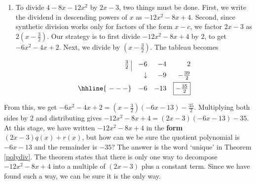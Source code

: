 {\begin{enumerate}
\item To divide $4-8x-12x^2$ by $2x-3$, two things must be done.  First, we write the dividend in descending powers of $x$ as $-12x^2-8x+4$.  Second, since synthetic division works only for factors of the form $x-c$, we factor $2x-3$ as $2\left(x-\frac{3}{2}\right)$.  Our strategy is to first divide $-12x^2-8x+4$ by $2$, to get $-6x^2-4x+2$.  Next, we divide by $\left(x-\frac{3}{2}\right)$.  The tableau becomes

\[ \begin{array}{rrrr}


  \frac{3}{2} \, \, \vline& -6 & -4 & 2   \\ [4pt]

   & \downarrow &  -9  & -\frac{39}{2}  \\ [4pt] \hhline{~---} 
  &  -6  &   -13  & \fbox{$-\frac{35}{2}$}  \\  
\end{array}\]


\end{enumerate}

From this, we get $-6x^2-4x+2 = \left(x-\frac{3}{2}\right)(-6 x - 13) - \frac{35}{2}$.  Multiplying both sides by $2$ and distributing gives $-12x^2-8x+4 = \left(2x-3\right) (-6 x - 13) - 35$.  At this stage, we have written $-12x^2-8x+4$ in the \textbf{form} $(2x-3) q(x) + r(x)$, but how can we be sure the quotient polynomial is $-6x-13$ and the remainder is $-35$?  The answer is the word `unique' in Theorem \ref{polydiv}.  The theorem states that there is only one way to decompose $-12x^2-8x+4$ into a multiple of $(2x-3)$  plus a constant term.  Since we have found such a way, we can be sure it is the only way.
}
